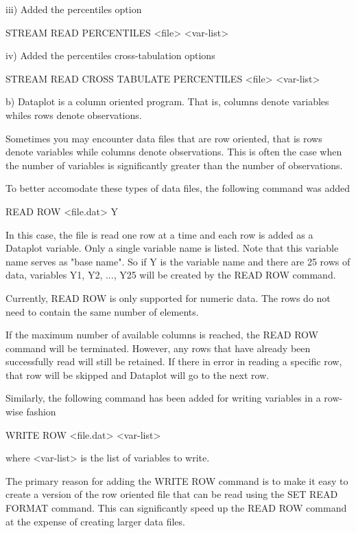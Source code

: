        iii) Added the percentiles option

               STREAM READ PERCENTILES <file>  <var-list>

        iv) Added the percentiles cross-tabulation options

               STREAM READ CROSS TABULATE PERCENTILES <file>  <var-list>

    b) Dataplot is a column oriented program.  That is, columns
       denote variables whiles rows denote observations.

       Sometimes you may encounter data files that are row
       oriented, that is rows denote variables while columns
       denote observations.  This is often the case when the
       number of variables is significantly greater than the
       number of observations.

       To better accomodate these types of data files, the
       following command was added

           READ ROW <file.dat>  Y

       In this case, the file is read one row at a time
       and each row is added as a Dataplot variable.  Only
       a single variable name is listed.  Note that this
       variable name serves as "base name".  So if Y is
       the variable name and there are 25 rows of data,
       variables Y1, Y2, ..., Y25 will be created by the
       READ ROW command.

       Currently, READ ROW is only supported for numeric
       data.  The rows do not need to contain the same
       number of elements.

       If the maximum number of available columns is reached,
       the READ ROW command will be terminated.  However,
       any rows that have already been successfully read
       will still be retained.  If there in error in reading
       a specific row, that row will be skipped and Dataplot
       will go to the next row.

       Similarly, the following command has been added for
       writing variables in a row-wise fashion

           WRITE ROW <file.dat>  <var-list>

       where <var-list> is the list of variables to write.

       The primary reason for adding the WRITE ROW command
       is to make it easy to create a version of the
       row oriented file that can be read using the
       SET READ FORMAT command.  This can significantly
       speed up the READ ROW command at the expense of
       creating larger data files.

